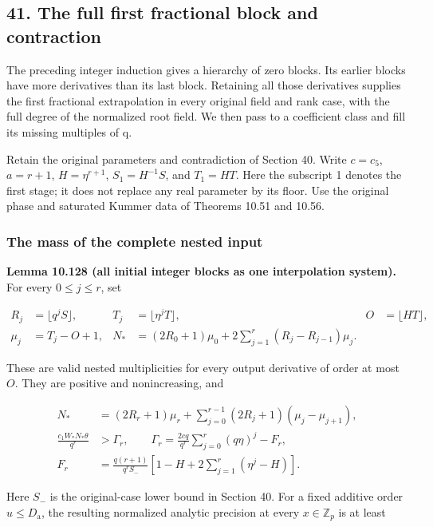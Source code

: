 \documentclass[
  11pt,
  a4paper,
]{article}
\begin{document}
\subsection{41. The full first fractional block and
contraction}\label{the-full-first-fractional-block-and-contraction}

The preceding integer induction gives a hierarchy of zero blocks. Its
earlier blocks have more derivatives than its last block. Retaining all
those derivatives supplies the first fractional extrapolation in every
original field and rank case, with the full degree of the normalized
root field. We then pass to a coefficient class and fill its missing
multiples of q.

Retain the original parameters and contradiction of Section 40. Write
\(c=c_5\), \(a=r+1\), \(H=\eta^{r+1}\), \(S_1=H^{-1}S\), and \(T_1=HT\).
Here the subscript 1 denotes the first stage; it does not replace any
real parameter by its floor. Use the original phase and saturated Kummer
data of Theorems 10.51 and 10.56.

\subsubsection{The mass of the complete nested
input}\label{the-mass-of-the-complete-nested-input}

\textbf{Lemma 10.128 (all initial integer blocks as one interpolation
system).} For every \(0\le j\le r\), set

\[
\begin{aligned}
R_j&=\lfloor q^jS\rfloor,&T_j&=\lfloor\eta^jT\rfloor,&O&=\lfloor HT\rfloor,\\
\mu_j&=T_j-O+1,&
N_*&=(2R_0+1)\mu_0+
2\sum_{j=1}^r(R_j-R_{j-1})\mu_j.
\end{aligned}
\tag{10.336}
\]

These are valid nested multiplicities for every output derivative of
order at most \(O\). They are positive and nonincreasing, and

\[
\begin{aligned}
N_*&=(2R_r+1)\mu_r+
\sum_{j=0}^{r-1}(2R_j+1)(\mu_j-\mu_{j+1}),\\
\frac{c_1W_*N_*\theta}{q^r}&>\Gamma_r,\qquad
\Gamma_r=\frac{2cq}{q^r}\sum_{j=0}^r(q\eta)^j-F_r,\\
F_r&=\frac{q(r+1)}{q^rS_-}
\left[1-H+2\sum_{j=1}^r(\eta^j-H)\right].
\end{aligned}
\tag{10.337}
\]

Here \(S_-\) is the original-case lower bound in Section 40. For a fixed
additive order \(u\le D_{\mathrm a}\), the resulting normalized analytic
precision at every \(x\in\mathbb Z_p\) is at least
\end{document}
